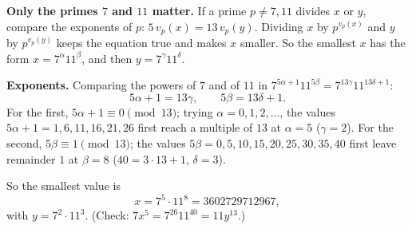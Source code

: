 \textbf{Only the primes $7$ and $11$ matter.} If a prime $p\ne7,11$ divides $x$ or $y$, compare the exponents of $p$: $5\,v_p(x)=13\,v_p(y)$. Dividing $x$ by $p^{v_p(x)}$ and $y$ by $p^{v_p(y)}$ keeps the equation true and makes $x$ smaller. So the smallest $x$ has the form $x=7^\alpha11^\beta$, and then $y=7^\gamma11^\delta$.

\textbf{Exponents.} Comparing the powers of $7$ and of $11$ in $7^{5\alpha+1}11^{5\beta}=7^{13\gamma}11^{13\delta+1}$:
\[5\alpha+1=13\gamma,\qquad5\beta=13\delta+1.\]
For the first, $5\alpha+1\equiv0\pmod{13}$; trying $\alpha=0,1,2,\dots$, the values $5\alpha+1=1,6,11,16,21,26$ first reach a multiple of $13$ at $\alpha=5$ ($\gamma=2$). For the second, $5\beta\equiv1\pmod{13}$; the values $5\beta=0,5,10,15,20,25,30,35,40$ first leave remainder $1$ at $\beta=8$ ($40=3\cdot13+1$, $\delta=3$).

So the smallest value is
\[x=\boxed{7^5\cdot11^8}=3602729712967,\]
with $y=7^2\cdot11^3$. (Check: $7x^5=7^{26}11^{40}=11y^{13}$.)
